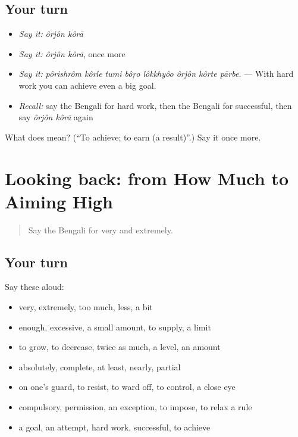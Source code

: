 \subsection*{Your turn}
\begin{itemize}
\raggedright
  \item \emph{Say it:} \emph{ôrjôn kôrā}
  \item \emph{Say it:} \emph{ôrjôn kôrā}, once more
  \item \emph{Say it:} \emph{pôrishrôm kôrle tumi bôṛo lôkkhyôo ôrjôn kôrte pārbe.} — With hard work you can achieve even a big goal.
  \item \emph{Recall:} say the Bengali for hard work, then the Bengali for successful, then say \emph{ôrjôn kôrā} again
\end{itemize}

\begin{tcolorbox}[breakable,colback=teal!4,colframe=teal!35!black,title={Before you move on}]
What does   mean? (\textquotedblleft{}To achieve; to earn (a result)\textquotedblright{}.) Say it once more.
\end{tcolorbox}
\section[(dialogue)]{Looking back: from How Much to Aiming High}

\label{lesson:BN-R376-review-370-376}



\begin{quote}
Say the Bengali for very and extremely.
\end{quote}

\subsection*{Your turn}
Say these aloud:

\begin{itemize}
\raggedright
  \item very, extremely, too much, less, a bit
  \item enough, excessive, a small amount, to supply, a limit
  \item to grow, to decrease, twice as much, a level, an amount
  \item absolutely, complete, at least, nearly, partial
  \item on one's guard, to resist, to ward off, to control, a close eye
  \item compulsory, permission, an exception, to impose, to relax a rule
  \item a goal, an attempt, hard work, successful, to achieve
\end{itemize}

